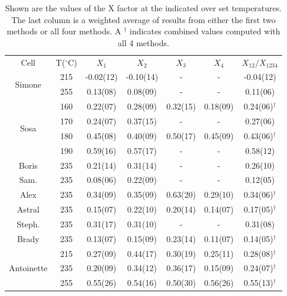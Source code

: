 \documentclass[pdftex,letterpaper,12pt]{report}
\begin{document}
\begin{table}\scriptsize
	\captionsetup{font=scriptsize}
	\begin{center}
		\def\arraystretch{0.75}
		\setlength\tabcolsep{1pt}
		\begin{tabular}{|c|c|cccc|c|}
			\hline
			Cell & T($^\circ$C) & $X_1$ & $X_2$ & $X_3$ & $X_4$ & $X_{12}/X_{1234}$\\ 
			\multirow{2}{*}{Simone} & 215 & -0.02(12) & -0.10(14) & - & - & -0.04(12) \\
			& 255 & 0.13(08) & 0.08(09) & - & - & 0.11(06) \\
			\hline
			\multirow{4}{*}{Sosa} & 160 & 0.22(07) & 0.28(09) & 0.32(15) & 0.18(09) & 0.24(06)$^\dagger$ \\
			& 170 & 0.24(07) & 0.37(15) & - & - & 0.27(06)\\
			& 180 & 0.45(08) & 0.40(09) & 0.50(17) & 0.45(09) & 0.43(06)$^\dagger$ \\
			& 190 & 0.59(16) & 0.57(17) & - & - & 0.58(12) \\
			\hline
			\hline
			Boris & 235 & 0.21(14) & 0.31(14) & - & - & 0.26(10)\\
			\hline
			Sam. & 235 & 0.08(06) & 0.22(09) & - & - & 0.12(05) \\
			\hline
			Alex & 235 & 0.34(09) & 0.35(09) & 0.63(20) & 0.29(10) & 0.34(06)$^\dagger$\\
			\hline
			Astral & 235 & 0.15(07) & 0.22(10) & 0.20(14) & 0.14(07) & 0.17(05)$^\dagger$\\
			\hline
			Steph. & 235 & 0.31(17) & 0.31(10) & - & - & 0.31(08)\\
			\hline
			Brady & 235 & 0.13(07) & 0.15(09) & 0.23(14) & 0.11(07) & 0.14(05)$^\dagger$\\
			\hline
			\multirow{3}{*}{Antoinette} & 215 & 0.27(09) & 0.44(17) & 0.30(19) & 0.25(11) & 0.28(08)$^\dagger$\\
			& 235 & 0.20(09) & 0.34(12) & 0.36(17) & 0.15(09) & 0.24(07)$^\dagger$\\
			& 255 & 0.55(26) & 0.54(16) & 0.50(30) & 0.56(26) & 0.55(13)$^\dagger$\\
			\hline
		\end{tabular}
		\caption
		{Shown are the values of the X factor at the indicated over set temperatures. The last column is a weighted average of results from either the first two methods or all four methods. A $^\dagger$ indicates combined values computed with all 4 methods.}
		\label{table:Xtable}
	\end{center}
\end{table}
\end{document}
